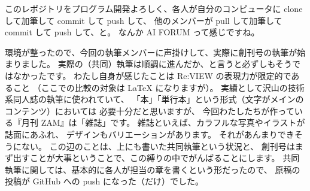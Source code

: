 \documentclass[dvipdfmx,autodetect-engine,10pt,b5paper,papersize,openany,dvipsnames]{jsbook}
\begin{document}
\begin{multicols}{2}
このレポジトリをプログラム開発よろしく、各人が自分のコンピュータに
clone して加筆して commit して push して、
他のメンバーが pull して加筆して commit して push して、と。
なんか AI FORUM って感じですね。


\vspace{7.0cm}

環境が整ったので、今回の執筆メンバーに声掛けして、実際に創刊号の執筆が始まりました。
実際の（共同）執筆は順調に進んだか、と言うと必ずしもそうではなかったです。
わたし自身が感じたことは Re:VIEW の表現力が限定的であること
（ここでの比較の対象は \LaTeX{} になりますが）。
実績として沢山の技術系同人誌の執筆に使われていて、
「本」「単行本」という形式（文字がメインのコンテンツ）においては
必要十分だと思いますが、
今回わたしたちが作っている『月刊 ZAM』は「雑誌」です。
雑誌といえば、カラフルな写真やイラストが誌面にあふれ、
デザインもバリエーションがあります。
それがあんまりできそうにない。
この辺のことは、上にも書いた共同執筆という状況と、
創刊号はまず出すことが大事ということで、この縛りの中でがんばることにします。
共同執筆に関しては、基本的に各人が担当の章を書くという形だったので、
原稿の投稿が GitHub への push になった（だけ）でした。



\end{multicols}
\end{document}
